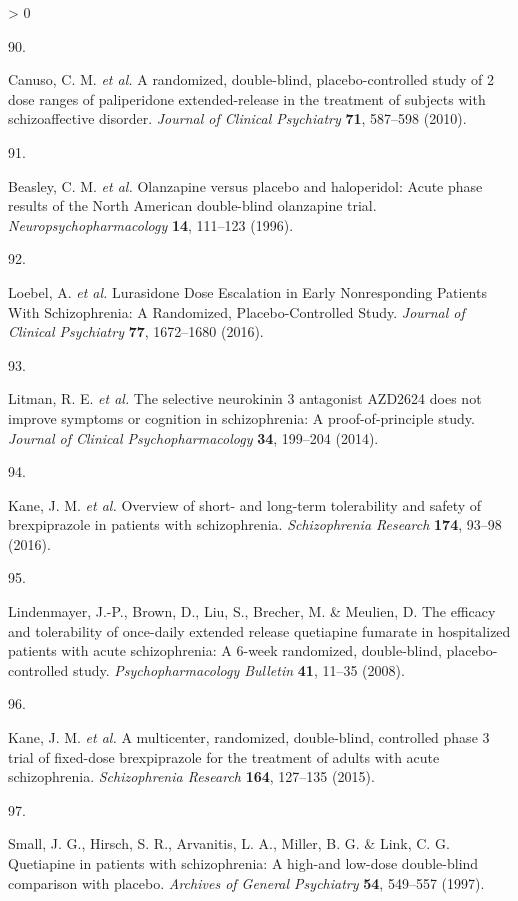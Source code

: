 \documentclass[
  9pt,
  english,
  ,jou,floatsintext]{apa6}
\newlength{\cslhangindent}
\newlength{\csllabelwidth}
\newenvironment{CSLReferences}[2] %
 {%
  \setlength{\parindent}{0pt}
  \ifodd #1 \everypar{\setlength{\hangindent}{\cslhangindent}}\ignorespaces\fi
  \ifnum #2 > 0
  \setlength{\parskip}{#2\baselineskip}
  \fi
 }%
 {}
\newcommand{\CSLLeftMargin}[1]{\parbox[t]{\csllabelwidth}{#1}}
\newcommand{\CSLRightInline}[1]{\parbox[t]{\linewidth - \csllabelwidth}{#1}\break}
\begin{document}
\begin{CSLReferences}{0}{0}
\leavevmode\hypertarget{ref-Canuso2010a}{}%
\CSLLeftMargin{90. }
\CSLRightInline{Canuso, C. M. \emph{et al.} A randomized, double-blind, placebo-controlled study of 2 dose ranges of paliperidone extended-release in the treatment of subjects with schizoaffective disorder. \emph{Journal of Clinical Psychiatry} \textbf{71}, 587--598 (2010).}

\leavevmode\hypertarget{ref-Beasley1996b}{}%
\CSLLeftMargin{91. }
\CSLRightInline{Beasley, C. M. \emph{et al.} Olanzapine versus placebo and haloperidol: Acute phase results of the {North} {American} double-blind olanzapine trial. \emph{Neuropsychopharmacology} \textbf{14}, 111--123 (1996).}

\leavevmode\hypertarget{ref-Loebel2016}{}%
\CSLLeftMargin{92. }
\CSLRightInline{Loebel, A. \emph{et al.} Lurasidone {Dose} {Escalation} in {Early} {Nonresponding} {Patients} {With} {Schizophrenia}: {A} {Randomized}, {Placebo}-{Controlled} {Study}. \emph{Journal of Clinical Psychiatry} \textbf{77}, 1672--1680 (2016).}

\leavevmode\hypertarget{ref-Litman2014}{}%
\CSLLeftMargin{93. }
\CSLRightInline{Litman, R. E. \emph{et al.} The selective neurokinin 3 antagonist {AZD2624} does not improve symptoms or cognition in schizophrenia: A proof-of-principle study. \emph{Journal of Clinical Psychopharmacology} \textbf{34}, 199--204 (2014).}

\leavevmode\hypertarget{ref-Kane2016}{}%
\CSLLeftMargin{94. }
\CSLRightInline{Kane, J. M. \emph{et al.} Overview of short- and long-term tolerability and safety of brexpiprazole in patients with schizophrenia. \emph{Schizophrenia Research} \textbf{174}, 93--98 (2016).}

\leavevmode\hypertarget{ref-Lindenmayer2008}{}%
\CSLLeftMargin{95. }
\CSLRightInline{Lindenmayer, J.-P., Brown, D., Liu, S., Brecher, M. \& Meulien, D. The efficacy and tolerability of once-daily extended release quetiapine fumarate in hospitalized patients with acute schizophrenia: A 6-week randomized, double-blind, placebo-controlled study. \emph{Psychopharmacology Bulletin} \textbf{41}, 11--35 (2008).}

\leavevmode\hypertarget{ref-Kane2015}{}%
\CSLLeftMargin{96. }
\CSLRightInline{Kane, J. M. \emph{et al.} A multicenter, randomized, double-blind, controlled phase 3 trial of fixed-dose brexpiprazole for the treatment of adults with acute schizophrenia. \emph{Schizophrenia Research} \textbf{164}, 127--135 (2015).}

\leavevmode\hypertarget{ref-Small1997}{}%
\CSLLeftMargin{97. }
\CSLRightInline{Small, J. G., Hirsch, S. R., Arvanitis, L. A., Miller, B. G. \& Link, C. G. Quetiapine in patients with schizophrenia: A high-and low-dose double-blind comparison with placebo. \emph{Archives of General Psychiatry} \textbf{54}, 549--557 (1997).}


\end{CSLReferences}
\end{document}
